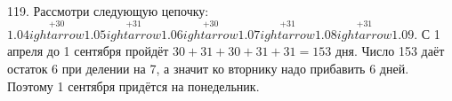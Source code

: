 119. Рассмотри следующую цепочку: $1.04\stackrel{+30}{
ightarrow}1.05\stackrel{+31}{
ightarrow}1.06\stackrel{+30}{
ightarrow}1.07\stackrel{+31}{
ightarrow}1.08\stackrel{+31}{
ightarrow}1.09.$
С 1 апреля до 1 сентября пройдёт $30+31+30+31+31=153$ дня. Число 153 даёт остаток 6 при делении на 7, а значит ко вторнику надо прибавить 6 дней. Поэтому 1 сентября придётся на понедельник.\\
